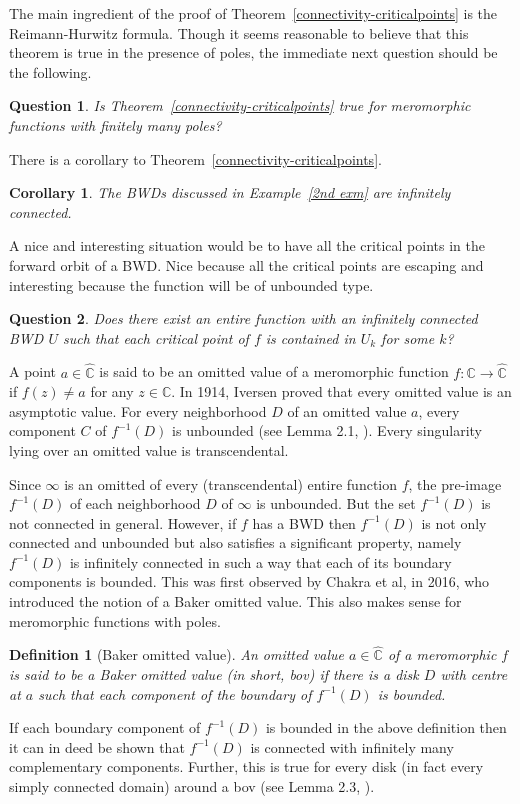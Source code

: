 \documentclass[11pt,a4paper]{article}
\newtheorem{corollary}{Corollary}[theorem]
\newtheorem{definition}{Definition}[section]
\newtheorem{Question}{Question}
\begin{document}
	The main ingredient of the proof of Theorem~\ref{connectivity-criticalpoints} is the Reimann-Hurwitz formula. Though it seems reasonable to believe that this theorem is true in the presence of poles, the immediate next  question should be the following.
	\begin{Question}
		Is Theorem~\ref{connectivity-criticalpoints} true for meromorphic functions with finitely many poles?
	\end{Question}
	There is a corollary to Theorem~\ref{connectivity-criticalpoints}.
		\begin{corollary} The BWDs discussed in Example~\ref{2nd exm} are infinitely connected.
		\label{SecondExample-infinitelyconnected}
	\end{corollary}
	A nice and interesting situation would be to have all the critical points in the forward orbit of a BWD. Nice because all the critical points are escaping and interesting because the function will be of unbounded type.  
	\begin{Question}
	Does there exist an entire function with an infinitely connected BWD $U$ such that each critical point of $f$ is contained in $U_k$ for some $k$?
	\end{Question}
	A point $a\in\mathbb{\widehat{C}}$ is said to be an omitted value of a meromorphic function   $f: \mathbb{C} \to \widehat{\mathbb{C}}$ if $f(z)\neq a$ for any $z\in\mathbb{C}$. In 1914, Iversen \cite{Iversen 1914} proved that every omitted value is an asymptotic value. For every neighborhood $D$ of an omitted value $a$,  every component
	$C$ of $f^{-1}(D)$  is unbounded (see Lemma 2.1, \cite{Nayak 2015}). Every singularity lying over an omitted value is transcendental.
	\par Since $\infty$ is an omitted of every (transcendental) entire function $f$,  the pre-image $f^{-1}(D)$ of each neighborhood $D$ of $\infty$ is unbounded. But  the set $f^{-1}(D)$ is not connected in general. However, if $f$ has a BWD then $f^{-1}(D)$ is not only connected and unbounded but also satisfies a significant property, namely $f^{-1}(D)$ is infinitely connected in such a way that each of its boundary components is bounded. This was first observed by  Chakra et al, \cite{ChakraChakrabortyNayak 2016} in 2016, who introduced the notion of a Baker omitted value. This also makes sense for meromorphic functions with poles.
	\begin{definition}[Baker omitted value]
		An omitted value $a\in\mathbb{\widehat{C}}$ of a meromorphic $f$ is said to be a Baker omitted value (in short, bov) if there is a disk $D$ with centre at $a$ such that each component of the boundary of $f^{-1}(D)$ is bounded. 
	\end{definition} 
	If each boundary component of $f^{-1}(D)$ is bounded in the above definition then it can in deed be shown that $f^{-1}(D)$ is connected with infinitely many complementary components. Further, this is true for every disk (in fact every simply connected domain) around a bov (see Lemma 2.3, \cite{ChakraChakrabortyNayak 2016}).
	
\end{document}
